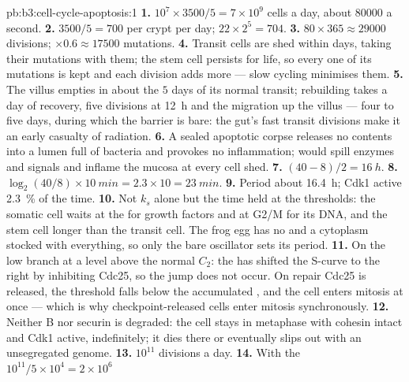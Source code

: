 \begin{solution}{pb:b3:cell-cycle-apoptosis:1}
\textbf{1.} $10^{7}\times 3500/5 = 7\times 10^{9}$ cells a day, about
\num{80000} a second.
\textbf{2.} $3500/5 = 700$ per crypt per day; $22\times 2^{5} = 704$.
\textbf{3.} $80\times 365 \approx \num{29000}$ divisions; $\times 0.6
\approx \num{17500}$ mutations.
\textbf{4.} Transit cells are shed within days, taking their mutations
with them; the stem cell persists for life, so every one of its
mutations is kept and each division adds more --- slow cycling
minimises them.
\textbf{5.} The villus empties in about the $5$ days of its normal
transit; rebuilding takes a day of recovery, five divisions at
\qty{12}{h} and the migration up the villus --- four to five days, during
which the barrier is bare: the gut's fast transit divisions make it an
early casualty of radiation.
\textbf{6.} A sealed apoptotic corpse releases no contents into a lumen
full of bacteria and provokes no inflammation;  would spill
enzymes and signals and inflame the mucosa at every cell shed.
\textbf{7.} $(40 - 8)/2 = \qty{16}{h}$.
\textbf{8.} $\log_{2}(40/8)\times \qty{10}{min} = 2.3\times 10 =
\qty{23}{min}$.
\textbf{9.} Period about \qty{16.4}{h}; Cdk1 active \qty{2.3}{\%} of the
time.
\textbf{10.} Not $k_{s}$ alone but the time held at the thresholds: the
somatic cell waits at the  for growth factors and at
G2/M for its DNA, and the stem cell longer than the transit cell. The
frog egg has no  and a cytoplasm stocked with everything, so
only the bare oscillator sets its period.
\textbf{11.} On the low branch at a  level above the normal
$C_{2}$: the  has shifted the S-curve to the right by
inhibiting Cdc25, so the jump does not occur. On repair Cdc25 is
released, the threshold falls below the accumulated , and the
cell enters mitosis at once --- which is why checkpoint-released cells
enter mitosis synchronously.
\textbf{12.} Neither  B nor securin is degraded: the cell stays in
metaphase with cohesin intact and Cdk1 active, indefinitely; it dies
there or eventually slips out with an unsegregated genome.
\textbf{13.} $10^{11}$ divisions a day.
\textbf{14.} With the  $10^{11}/5\times 10^{4} = 2\times 10^{6}$

\end{solution}
